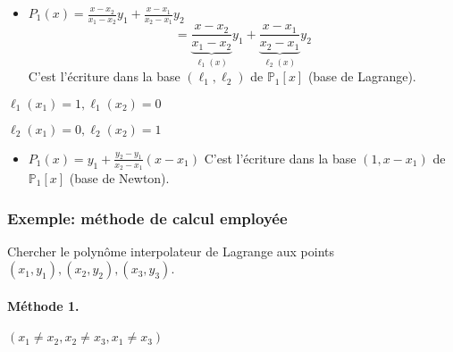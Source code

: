 \documentclass[oneside]{book}
\begin{document}
\begin{itemize}
    \item $P_1(x) = \frac{x-x_2}{x_1-x_2} y_1 + \frac{x-x_1}{x_2-x_1} y_2$
    \[
    = \underbrace{\frac{x-x_2}{x_1-x_2}}_{\ell_1(x)} y_1 + \underbrace{\frac{x-x_1}{x_2-x_1}}_{\ell_2(x)} y_2
    \]
    C'est l'écriture dans la base $(\ell_1, \ell_2)$ de $\mathbb{P}_1[x]$ (base de Lagrange).
\end{itemize}

\begin{remark}
$\ell_1(x_1) = 1, \ell_1(x_2) = 0$

$\ell_2(x_1) = 0, \ell_2(x_2) = 1$
\end{remark}

\begin{itemize}
    \item $P_1(x) = y_1 + \frac{y_2-y_1}{x_2-x_1} (x-x_1)$
    C'est l'écriture dans la base $(1, x-x_1)$ de $\mathbb{P}_1[x]$ (base de Newton).
\end{itemize}


\subsubsection{Exemple: méthode de calcul employée}

Chercher le polynôme interpolateur de Lagrange aux points $(x_1, y_1), (x_2, y_2), (x_3, y_3)$.

\paragraph{Méthode 1.} $(x_1 \neq x_2, x_2 \neq x_3, x_1 \neq x_3)$
\end{document}
